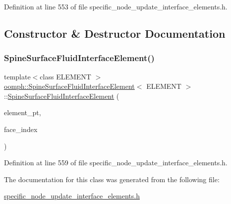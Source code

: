 Definition at line 553 of file specific\+\_\+node\+\_\+update\+\_\+interface\+\_\+elements.\+h.



\subsection{Constructor \& Destructor Documentation}
\mbox{\label{classoomph_1_1SpineSurfaceFluidInterfaceElement_aa1d52a09e4f50085b957463a0da22d4a}} 
\subsubsection{\texorpdfstring{Spine\+Surface\+Fluid\+Interface\+Element()}{SpineSurfaceFluidInterfaceElement()}}
{\footnotesize\ttfamily template$<$class E\+L\+E\+M\+E\+NT $>$ \\
\hyperlink{classoomph_1_1SpineSurfaceFluidInterfaceElement}{oomph\+::\+Spine\+Surface\+Fluid\+Interface\+Element}$<$ E\+L\+E\+M\+E\+NT $>$\+::\hyperlink{classoomph_1_1SpineSurfaceFluidInterfaceElement}{Spine\+Surface\+Fluid\+Interface\+Element} (\begin{DoxyParamCaption}\item[{\hyperlink{classoomph_1_1FiniteElement}{Finite\+Element} $\ast$const \&}]{element\+\_\+pt,  }\item[{const int \&}]{face\+\_\+index }\end{DoxyParamCaption})\hspace{0.3cm}{\ttfamily [inline]}}



Definition at line 559 of file specific\+\_\+node\+\_\+update\+\_\+interface\+\_\+elements.\+h.



The documentation for this class was generated from the following file\+:\begin{DoxyCompactItemize}
\item 
\hyperlink{specific__node__update__interface__elements_8h}{specific\+\_\+node\+\_\+update\+\_\+interface\+\_\+elements.\+h}\end{DoxyCompactItemize}
